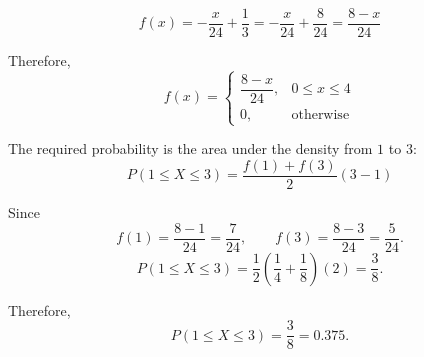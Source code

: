{		\[
			f(x)
			=-\frac{x}{24}+\frac13 = -\frac{x}{24}+\frac{8}{24} =\frac{8-x}{24}
		\]
		
		Therefore,
		\[
		f(x)=
		\begin{cases}
			\dfrac{8-x}{24},&0\le x\le4\\[1mm]
			0,&\text{otherwise}
		\end{cases}
		\]
		
		The required probability is the area under the density from \(1\) to \(3\):
		\[
		P(1\le X\le3)
		=
		\frac{f(1)+f(3)}{2}(3-1)
		\]
		
		Since
		\[
		f(1)=\frac{8-1}{24}=\frac{7}{24},
		\qquad
		f(3)=\frac{8-3}{24}=\frac{5}{24}.
		\]
		\[
		P(1\le X\le3)
		=
		\frac12
		\left(
		\frac14+\frac18
		\right)(2)
		=
		\frac38.
		\]
		
		Therefore,
		\[
		\boxed{P(1\le X\le3)=\frac38=0.375}.
		\]
		
		
		\vspace{-5mm}
		
	}
	
